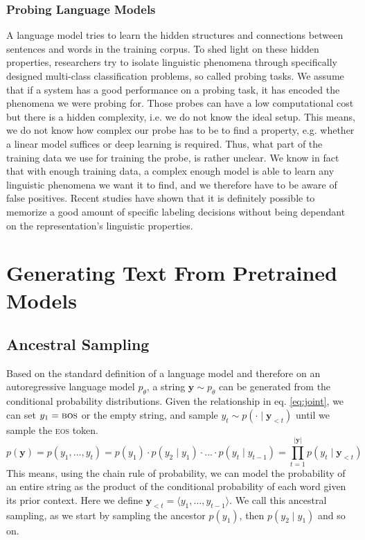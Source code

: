 \subsubsection{Probing Language Models}
A language model tries to learn the hidden structures and connections between sentences and words in the training corpus. To shed light on these hidden properties, researchers try to isolate linguistic phenomena through specifically designed multi-class classification problems, so called probing tasks. We assume that if a system has a good performance on a probing task, it has encoded the phenomena we were probing for. Those probes can have a low computational cost but there is a hidden complexity, i.e. we do not know the ideal setup. This means, we do not know how complex our probe has to be to find a property, e.g. whether a linear model suffices or deep learning is required. Thus, what part of the training data we use for training the probe, is rather unclear. We know in fact that with enough training data, a complex enough model is able to learn any linguistic phenomena we want it to find, and we therefore have to be aware of false positives. Recent studies have shown that it is definitely possible to memorize a good amount of specific labeling decisions without being dependant on the representation's linguistic properties. \cite{desintpro, gul2019linspector, hewitt2019structural, white2021non, lingwis}

\section{Generating Text From Pretrained Models}\label{sec:gentext}
\subsection{Ancestral Sampling}\label{sec:sampling}
Based on the standard definition of a language model and therefore on an autoregressive language model $p_\theta$, a string $\mathbf{y}\sim p_\theta$ can be generated from the conditional probability distributions. Given the relationship in eq. \ref{eq:joint}, we can set $y_1 = \textsc{bos}$ or the empty string, and sample $y_t\sim p(\cdot\mid\mathbf{y}_{<t})$ until we sample the \textsc{eos} token. 
\begin{equation}\label{eq:joint}
    p(\mathbf{y})=p(y_1,...,y_t)=p(y_1)\cdot p(y_2\mid y_1)\cdot...\cdot p(y_t\mid y_{t-1})=\prod_{t=1}^{|\mathbf{y}|} p(y_t\mid\mathbf{y}_{<t})
\end{equation}
This means, using the chain rule of probability, we can model the probability of an entire string as the product of the conditional probability of each word given its prior context. Here we define $\mathbf{y}_{<t} = \langle y_1, \dots, y_{t-1}\rangle$. We call this ancestral sampling, as we start by sampling the ancestor $p(y_1)$, then $p(y_2\mid y_1)$ and so on.

